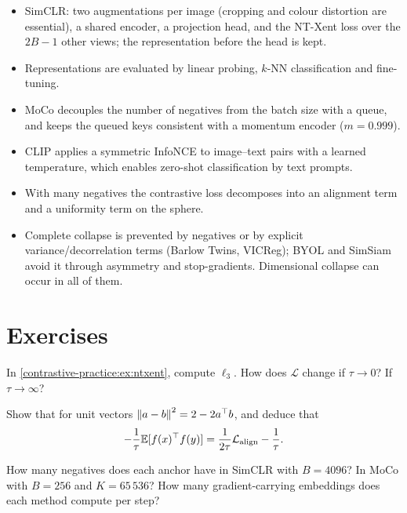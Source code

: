 \begin{notechapter}
\begin{chaptersummary}
\begin{itemize}
  \item SimCLR: two augmentations per image (cropping and colour distortion are essential), a shared
        encoder, a projection head, and the NT-Xent loss over the $2B - 1$ other views; the representation before the
        head is kept.
  \item Representations are evaluated by linear probing, $k$-NN classification and fine-tuning.
  \item MoCo decouples the number of negatives from the batch size with a queue, and keeps the
        queued keys consistent with a momentum encoder ($m = 0.999$).
  \item CLIP applies a symmetric InfoNCE to image--text pairs with a learned temperature, which
        enables zero-shot classification by text prompts.
  \item With many negatives the contrastive loss decomposes into an alignment term and a
        uniformity term on the sphere.
  \item Complete collapse is prevented by negatives or by explicit variance/decorrelation terms
        (Barlow Twins, VICReg); BYOL and SimSiam avoid it through asymmetry and stop-gradients.
        Dimensional collapse can occur in all of them.
\end{itemize}
\end{chaptersummary}

\section*{Exercises}

\begin{exercise}\label{contrastive-practice:exr:1}
In \cref{contrastive-practice:ex:ntxent}, compute $\ell_3$. How does $\mathcal L$ change if $\tau\to0$? If $\tau\to\infty$?
\end{exercise}

\begin{exercise}\label{contrastive-practice:exr:2}
Show that for unit vectors $\left\|a - b\right\|^2 = 2 - 2a^\top b$, and deduce that
\[
  -\frac1\tau\mathbb{E}[f(x)^\top f(y)] = \frac1{2\tau}\mathcal L_{\mathrm{align}} - \frac1\tau .
\]
\end{exercise}

\begin{exercise}\label{contrastive-practice:exr:3}
How many negatives does each anchor have in SimCLR with $B = 4096$? In MoCo with $B = 256$ and $K = 65\,536$? How
many gradient-carrying embeddings does each method compute per step?
\end{exercise}


\end{notechapter}
